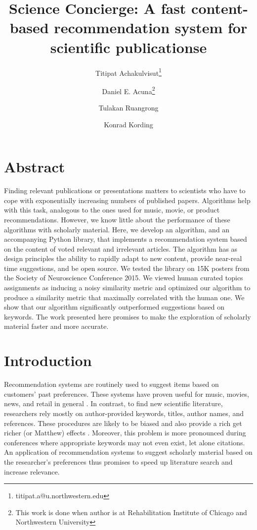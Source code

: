 \documentclass[a4paper]{article}
\title{Science Concierge: A fast content-based recommendation system for scientific publicationse}
\author[1]{Titipat Achakulvisut\thanks{titipat.a@u.northwestern.edu}}
\author[3]{Daniel E. Acuna\thanks{This work is done when author is at Rehabilitation Institute of Chicago and Northwestern University}}
\author[4]{Tulakan Ruangrong}
\author[1,2]{Konrad Kording}
\affil[1]{Northwestern University}
\affil[2]{Rehabilitation Institute of Chicago}
\affil[3]{Syracuse University}
\affil[4]{Mahidol University}
\begin{document}
\maketitle

\section{Abstract}

Finding relevant publications or presentations matters to scientists who have to cope with exponentially increasing numbers of published papers. Algorithms help with this task, analogous to the ones used for music, movie, or product recommendations. However, we know little about the performance of these algorithms with scholarly material. Here, we develop an algorithm, and an accompanying Python library, that implements a recommendation system based on the content of voted relevant and irrelevant articles. The algorithm has as design principles the ability to rapidly adapt to new content, provide near-real time suggestions, and be open source. We tested the library on 15K posters from the Society of Neuroscience Conference 2015. We viewed human curated topics assignments as inducing a noisy similarity metric and optimized our algorithm to produce a similarity metric that maximally correlated with the human one. We show that our algorithm significantly outperformed suggestions based on keywords.  The work presented here promises to make the exploration of scholarly material faster and more accurate.

\section{Introduction}

Recommendation systems are routinely used to suggest items based on customers’ past preferences. These systems have proven useful for music, movies, news, and retail in general \cite{manning2008introduction}. In contrast, to find new scientific literature, researchers rely mostly on author-provided keywords, titles, author names, and references. These procedures are likely to be biased \cite{chavalarias2010science} and also provide a rich get richer (or Matthew) effects \cite{petersen2011quantitative}. Moreover, this problem is more pronounced during conferences where appropriate keywords may not even exist, let alone citations. An application of recommendation systems to suggest scholarly material based on the researcher’s preferences thus promises to speed up literature search and increase relevance.
\end{document}
